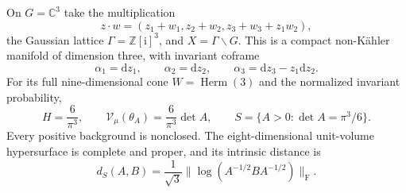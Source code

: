 \begin{example}\label{ex:iwasawa-complete-gaud-cone}
On $G=\mathbb C^3$ take the multiplication
\[
 z\cdot w=(z_1+w_1,z_2+w_2,z_3+w_3+z_1w_2),
\]
the Gaussian lattice $\Gamma=\mathbb Z[\mathrm i]^3$, and $X=\Gamma\backslash G$. This is a compact non-K\"ahler manifold of dimension three, with invariant coframe
\[
 \alpha_1=\mathrm dz_1,\qquad \alpha_2=\mathrm dz_2,\qquad
 \alpha_3=\mathrm dz_3-z_1\mathrm dz_2.
\]
For its full nine-dimensional cone $W=\operatorname{Herm}(3)$ and the normalized invariant probability,
\[
 H=\frac6{\pi^3},\qquad
 \mathcal V_\mu(\theta_A)=\frac6{\pi^3}\det A,\qquad
 S=\{A>0:\det A=\pi^3/6\}.
\]
Every positive background is nonclosed. The eight-dimensional unit-volume hypersurface is complete and proper, and its intrinsic distance is
\begin{equation}\label{eq:iwasawa-unit-volume-distance}
 d_S(A,B)=\frac1{\sqrt3}\|\log(A^{-1/2}BA^{-1/2})\|_{\mathrm F}.
\end{equation}
\end{example}

